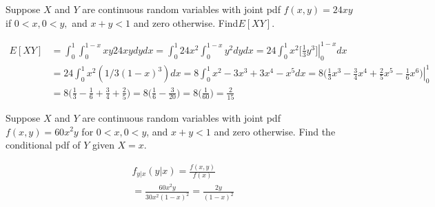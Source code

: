 \documentclass[answers]{exam}
\begin{document}
\begin{questions}
\question 
Suppose $X$ and $Y$ are continuous random variables with joint pdf
\(f(x,y)= 24xy\) if \(0<x,0<y,\) and \(x+y<1\) and zero otherwise. Find\(E[XY]\).
\begin{solution}
	\begin{align*}
		E[XY]
		&= \int_{0}^{1}\int_{0}^{1-x} xy 24 xy dy dx
		= \int_{0}^{1} 24x^2 \int_{0}^{1-x} y^2 dy dx
		= 24 \int_{0}^{1} x^2 \bigg[\left. \frac{1}{3}y^3 \bigg]\right|_{0}^{1-x} dx
		\\&= 24 \int_{0}^{1} x^2 (1/3(1-x)^3) dx
		= 8 \int_{0}^{1} x^2-3x^3+3x^4-x^5  dx
		= 8 \left. \bigg(\frac{1}{3}x^3-\frac{3}{4}x^4+\frac{2}{5}x^5-\frac{1}{6}x^6\bigg) \right|_{0}^{1}
		\\&= 8\bigg(\frac{1}{3}-\frac{1}{6}+\frac{3}{4}+\frac{2}{5}\bigg)
		= 8\bigg(\frac{1}{6}-\frac{3}{20}\bigg)
		= 8\bigg(\frac{1}{60}\bigg)
		= \frac{2}{15}
	\end{align*}
\end{solution}

\question 
Suppose $X$ and $Y$ are continuous random variables with joint pdf
\(f(x,y) = 60x^2y\) for \(0<x,0<y\), and \(x+y<1\) and zero otherwise. Find the
conditional pdf of $Y$ given \(X=x\).
\begin{solution}
	\begin{align*}
		&f_{y|x}(y|x) 
		= \frac{f(x,y)}{f(x)} 
		\\&= \frac{60x^2y}{30x^2(1-x)^2}
		= \frac{2y}{(1-x)^2}
	\end{align*}
\end{solution}

\end{questions}
\end{document}
